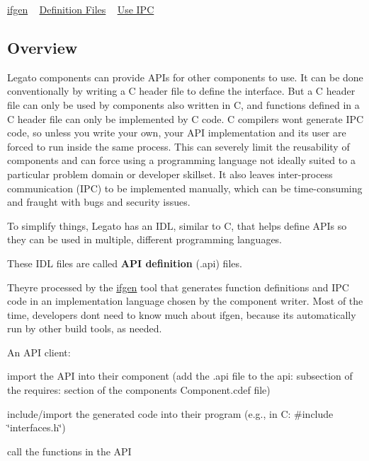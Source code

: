 \hyperlink{buildToolsifgen}{ifgen} ~\newline
 \hyperlink{defFiles}{Definition Files} ~\newline
 \hyperlink{basicAppsIPC}{Use I\+P\+C}\hypertarget{interface_def_lang_interfaceDefLang_overview}{}\subsection{Overview}\label{interface_def_lang_interfaceDefLang_overview}
Legato components can provide A\+P\+Is for other components to use. It can be done conventionally by writing a C header file to define the interface. But a C header file can only be used by components also written in C, and functions defined in a C header file can only be implemented by C code. C compilers won\textquotesingle{}t generate I\+P\+C code, so unless you write your own, your A\+P\+I implementation and its user are forced to run inside the same process. This can severely limit the reusability of components and can force using a programming language not ideally suited to a particular problem domain or developer skillset. It also leaves inter-\/process communication (I\+P\+C) to be implemented manually, which can be time-\/consuming and fraught with bugs and security issues.

To simplify things, Legato has an I\+D\+L, similar to C, that helps define A\+P\+Is so they can be used in multiple, different programming languages.

These I\+D\+L files are called {\bfseries  A\+P\+I definition } ({\ttfamily .api}) files.

They\textquotesingle{}re processed by the \hyperlink{buildToolsifgen}{ifgen} tool that generates function definitions and I\+P\+C code in an implementation language chosen by the component writer. Most of the time, developers don\textquotesingle{}t need to know much about {\ttfamily ifgen}, because it\textquotesingle{}s automatically run by other build tools, as needed.

An A\+P\+I client\+:
\begin{DoxyItemize}
\item import the A\+P\+I into their component (add the {\ttfamily .api} file to the {\ttfamily api\+:} subsection of the {\ttfamily requires\+:} section of the component\textquotesingle{}s {\ttfamily Component.\+cdef} file)
\item include/import the generated code into their program (e.\+g., in C\+: {\ttfamily \#include \char`\"{}interfaces.\+h\char`\"{}})
\item call the functions in the A\+P\+I
\end{DoxyItemize}

